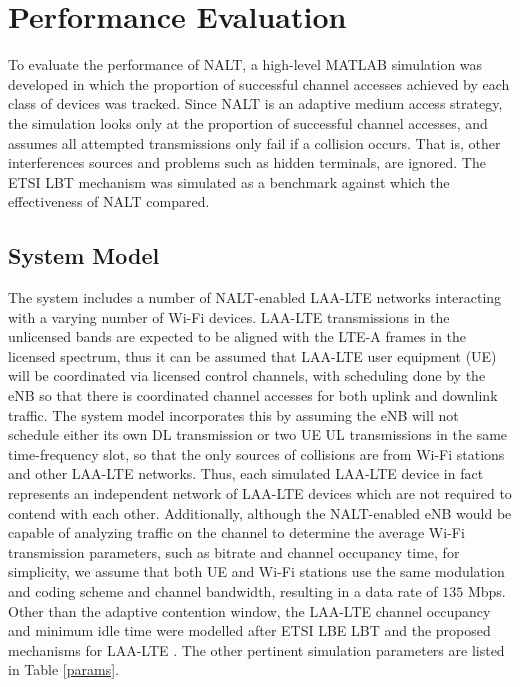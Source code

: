 \section{Performance Evaluation}\label{perf-eval}
To evaluate the performance of NALT, a high-level MATLAB simulation was developed in which the proportion of successful channel accesses achieved by each class of devices was tracked. Since NALT is an adaptive medium access strategy, the simulation looks only at the proportion of successful channel accesses, and assumes all attempted transmissions only fail if a collision occurs.  That is, other interferences sources and problems such as hidden terminals, are ignored.  The ETSI LBT mechanism was simulated as a benchmark against which the effectiveness of NALT compared.


\subsection{System Model}
\label{sys-model}
The system includes a number of NALT-enabled \mbox{LAA-LTE} networks interacting with a varying number of \mbox{Wi-Fi} devices.  \mbox{LAA-LTE} transmissions in the unlicensed bands are expected to be aligned with the LTE-A frames in the licensed spectrum, thus it can be assumed that \mbox{\mbox{LAA-LTE}} user equipment (UE) will be coordinated via licensed control channels, with scheduling done by the eNB so that there is coordinated channel accesses for both uplink and downlink traffic.  The system model incorporates this by assuming the eNB will not schedule either its own DL transmission or two UE UL transmissions in the same time-frequency slot, so that the only sources of collisions are from \mbox{Wi-Fi} stations and other \mbox{LAA-LTE} networks. Thus, each simulated \mbox{LAA-LTE} device in fact represents an independent network of \mbox{LAA-LTE} devices which are not required to contend with each other. Additionally, although the NALT-enabled eNB would be capable of analyzing traffic on the channel to determine the average \mbox{Wi-Fi} transmission parameters, such as bitrate and channel occupancy time, for simplicity, we assume that both UE and \mbox{\mbox{Wi-Fi}} stations use the same modulation and coding scheme and channel bandwidth, resulting in a data rate of $135$ Mbps.  Other than the adaptive contention window, the \mbox{LAA-LTE} channel occupancy and minimum idle time were modelled after ETSI LBE LBT and the proposed mechanisms for \mbox{\mbox{LAA-LTE}} \cite{3gpp}.  The other pertinent simulation parameters are listed in Table \ref{params}.
